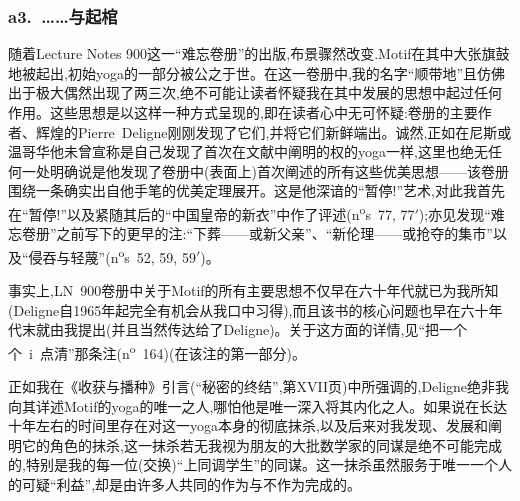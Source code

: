\subsubsection*{a3.~……与起棺}


随着Lecture Notes 900这一“难忘卷册”的出版,布景骤然改变.Motif在其中大张旗鼓地被起出,初始yoga的一部分被公之于世。在这一卷册中,我的名字“顺带地”且仿佛出于极大偶然出现了两三次,绝不可能让读者怀疑我在其中发展的思想中起过任何作用。这些思想是以这样一种方式呈现的,即在读者心中无可怀疑:卷册的主要作者、辉煌的Pierre~Deligne刚刚发现了它们,并将它们新鲜端出。诚然,正如在尼斯或温哥华他未曾宣称是自己发现了首次在文献中阐明的权的yoga一样,这里也绝无任何一处\dmark{}明确说是他发现了卷册中(表面上)首次阐述的所有这些优美思想——该卷册围绕一条确实出自他手笔的优美定理展开。这是他深谙的“暂停!”艺术,对此我首先在“暂停!”以及紧随其后的“中国皇帝的新衣”中作了评述(n\textsuperscript{o}s~77, 77$'$);亦见发现“难忘卷册”之前写下的更早的注:“下葬——或新父亲”、“新伦理——或抢夺的集市”以及“侵吞与轻蔑”(n\textsuperscript{o}s~52, 59, 59$'$)。

事实上,LN~900卷册中关于Motif的所有主要思想不仅早在六十年代就已为我所知(Deligne自1965年起完全有机会从我口中习得),而且该书的核心问题也早在六十年代末就由我提出(并且当然传达给了Deligne)。关于这方面的详情,见“把一个个~i~点清”那条注(n\textsuperscript{o}~164)(在该注的第一部分)。

正如我在《收获与播种》引言(“秘密的终结”,第XVII页)中所强调的,Deligne绝非我向其详述Motif的yoga的唯一之人,哪怕他是唯一深入将其内化之人。如果说在长达十年左右的时间里存在对这一yoga本身的彻底抹杀,以及后来对我发现、发展和阐明它的角色的抹杀,这一抹杀若无我视为朋友的大批数学家的同谋是绝不可能完成的,特别是我的每一位(交换)“上同调学生”的同谋。这一抹杀虽然服务于唯一一个人的可疑“利益”,却是由许多人共同的作为与不作为完成的。

